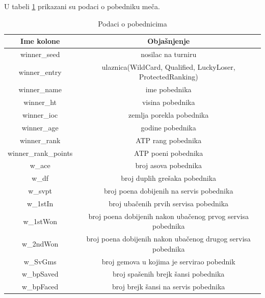 \documentclass[a4paper]{article}
\begin{document}
U tabeli \ref{table:pobednici} prikazani su podaci o pobedniku meča.
\begin{table}
	\begin{center}
		\begin{tabular}{ | c | c | } 
			\hline
			Ime kolone & Objašnjenje \\ 
			\hline
			winner\_seed & nosilac na turniru \\
			winner\_entry & ulaznica(WildCard, Qualified, LuckyLoser, ProtectedRanking) \\
			winner\_name & ime pobednika \\
			winner\_ht & visina pobednika \\
			winner\_ioc & zemlja porekla pobednika \\
			winner\_age & godine pobednika \\
			winner\_rank & ATP rang pobednika \\
			winner\_rank\_points & ATP poeni pobednika \\
			w\_ace & broj asova pobednika \\
			w\_df & broj duplih grešaka pobednika \\ 
			w\_svpt & broj poena dobijenih na servis pobednika \\
			w\_1stIn & broj ubačenih prvih servisa pobednika \\
			w\_1stWon & broj poena dobijenih nakon ubačenog prvog servisa pobednika \\
			w\_2ndWon & broj poena dobijenih nakon ubačenog drugog servisa pobednika \\
			w\_SvGms & broj gemova u kojima je servirao pobednik \\
			w\_bpSaved & broj spašenih brejk šansi pobednika \\
			w\_bpFaced & broj brejk šansi na servis pobednika \\ 
			\hline
		\end{tabular}
	\end{center}
	\caption{Podaci o pobednicima}
	\label{table:pobednici}
\end{table}
\end{document}
